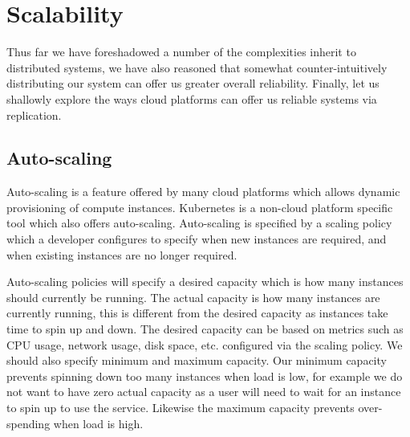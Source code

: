 

\section{Scalability}
Thus far we have foreshadowed a number of the complexities inherit to distributed systems,
we have also reasoned that somewhat counter-intuitively distributing our system can offer us greater overall reliability.
Finally, let us shallowly explore the ways cloud platforms can offer us reliable systems via replication.

\subsection{Auto-scaling}
Auto-scaling is a feature offered by many cloud platforms which allows dynamic provisioning of compute instances.
Kubernetes is a non-cloud platform specific tool which also offers auto-scaling.
Auto-scaling is specified by a scaling policy which a developer configures to specify when new instances are required, and when existing instances are no longer required.

Auto-scaling policies will specify a desired capacity which is how many instances should currently be running.
The actual capacity is how many instances are currently running,
this is different from the desired capacity as instances take time to spin up and down.
The desired capacity can be based on metrics such as CPU usage, network usage, disk space, etc. configured via the scaling policy.
We should also specify minimum and maximum capacity.
Our minimum capacity prevents spinning down too many instances when load is low, 
for example we do not want to have zero actual capacity as a user will need to wait for an instance to spin up to use the service.
Likewise the maximum capacity prevents over-spending when load is high.

